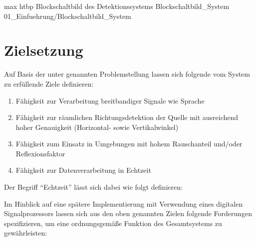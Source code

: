          {max}
         {htbp}
         {Blockschaltbild des Detektionssystems}
         {Blockschaltbild_System} 
         {01_Einfuehrung/Blockschaltbild_System}                                






\section{Zielsetzung}
\label{sec:Zielsetzung}
Auf Basis der unter  genannten Problemstellung lassen sich folgende vom System zu erfüllende Ziele definieren:

\begin{enumerate}
    \item Fähigkeit zur Verarbeitung breitbandiger Signale wie Sprache
    \item Fähigkeit zur räumlichen Richtungsdetektion der Quelle mit ausreichend hoher Genauigkeit (Horizontal- sowie Vertikalwinkel)
    \item Fähigkeit zum Einsatz in Umgebungen mit hohem Rauschanteil und/oder Reflexionsfaktor
    \item Fähigkeit zur Datenverarbeitung in Echtzeit
\end{enumerate}

Der Begriff "`Echtzeit"' lässt sich dabei wie folgt definieren: \\



Im Hinblick auf eine spätere Implementierung mit Verwendung eines digitalen Signalprozessors lassen sich aus den oben genannten Zielen folgende Forderungen spezifizieren, um eine ordnungsgemäße Funktion des Gesamtsystems zu gewährleisten:

